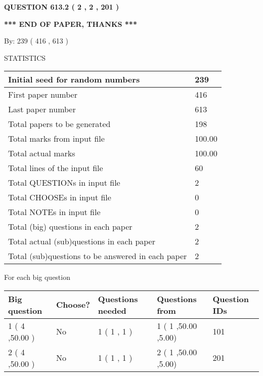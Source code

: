 \documentclass{ctexart}
\begin{document}
{\textbf{\Large{QUESTION
613.2 
 ( 2 , 2 , 201 )
}}}
  
  
   
   
 \vspace{0.2in}
 
   
   
   
   
\vspace{1.0in} 
{\textbf{\large{ *** END OF PAPER, THANKS *** }}} 
   
   
\hspace{1.0in} By: 
 239 ( 416 ,  613 )
   
   
   
\vspace{0.2in}
\vspace{0.2in}
   
   
 \newpage
\setcounter{page}{1} 
   
   
 {\LARGE{STATISTICS}}
   
\vspace{0.2in}
   
 \begin{tabular}{|l|l|}
 \hline
 Initial seed for random numbers & 239  \\
\hline
 First paper number & 416  \\
\hline
 Last  paper number & 613  \\
\hline
 Total papers to be generated & 198  \\
\hline
Total marks from input file & 100.00 \\
\hline
Total actual marks & 100.00 \\
\hline
 Total lines of the input file & 60  \\
 \hline
 Total QUESTIONs in input file & 2  \\
\hline
 Total CHOOSEs in input file & 0  \\
\hline
 Total NOTEs in input file & 0  \\
\hline
 Total (big) questions in each paper & 2  \\
\hline
 Total actual (sub)questions in each paper & 2  \\
\hline
 Total (sub)questions to be answered in each paper & 2  \\
\hline
 \end{tabular}
   
   
 \newpage
   
{\LARGE{For each big question}}
   
   
\vspace{0.2in}
   
   
\noindent\hspace{-0.4in}\begin{tabular}{|l|l|l|l|l|}
\hline
 Big question & Choose? & Questions needed & Questions from & Question IDs \\ 
\hline
 1 ( 4 ,50.00
 ) &  No   & 
 1 ( 1 ,  1 ) &  1 ( 1
,50.00
 ,5.00) &  101  \\
 \hline
 2 ( 4 ,50.00
 ) &  No   & 
 1 ( 1 ,  1 ) &  2 ( 1
,50.00
 ,5.00) &  201  \\
 \hline
 \end{tabular}
 
 
\end{document}
